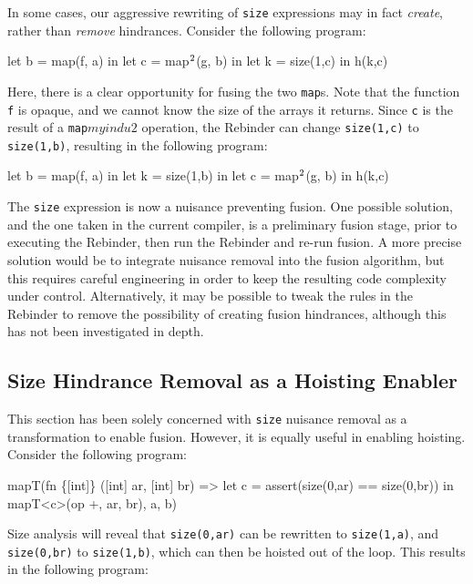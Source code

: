 In some cases, our aggressive rewriting of \texttt{size} expressions
may in fact \textit{create}, rather than \textit{remove} hindrances.
Consider the following program:

\begin{colorcode}
let b = map(f, a) in
let c = map\(^{2}\)(g, b) in
let k = size(1,c) in
h(k,c)
\end{colorcode}

Here, there is a clear opportunity for fusing the two \texttt{map}s.
Note that the function \texttt{f} is opaque, and we cannot know the
size of the arrays it returns.  Since \texttt{c} is the result of a
\texttt{map\(myindu{2}\)} operation, the Rebinder can change
\texttt{size(1,c)} to \texttt{size(1,b)}, resulting in the following
program:

\begin{colorcode}
let b = map(f, a) in
let k = size(1,b) in
let c = map\(^{2}\)(g, b) in
h(k,c)
\end{colorcode}

The \texttt{size} expression is now a nuisance preventing fusion.  One
possible solution, and the one taken in the current \LO{} compiler, is
a preliminary fusion stage, prior to executing the Rebinder, then run
the Rebinder and re-run fusion.  A more precise solution would be to
integrate nuisance removal into the fusion algorithm, but this
requires careful engineering in order to keep the resulting code
complexity under control.  Alternatively, it may be possible to tweak
the rules in the Rebinder to remove the possibility of creating fusion
hindrances, although this has not been investigated in depth.

\subsection{Size Hindrance Removal as a Hoisting Enabler}

This section has been solely concerned with \texttt{size} nuisance
removal as a transformation to enable fusion.  However, it is equally
useful in enabling hoisting.  Consider the following program:

\begin{colorcode}
mapT(fn \{[int]\} ([int] ar, [int] br) =>
       let c = assert(size(0,ar) == size(0,br)) in
       mapT<c>(op +, ar, br),
     a, b)
\end{colorcode}

Size analysis will reveal that \texttt{size(0,ar)} can be rewritten to
\texttt{size(1,a)}, and \texttt{size(0,br)} to \texttt{size(1,b)},
which can then be hoisted out of the loop.  This results in the
following program:

